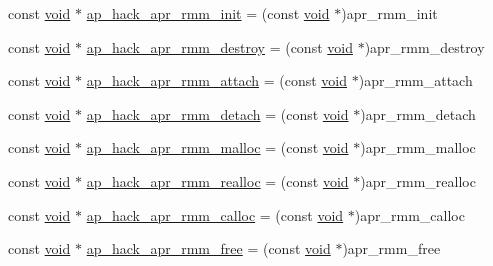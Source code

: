 \begin{DoxyCompactItemize}
\item 
const \hyperlink{group__MOD__ISAPI_gacd6cdbf73df3d9eed42fa493d9b621a6}{void} $\ast$ \hyperlink{srclib_2apr-util_2exports_8c_a153a0a8b4ae7204967c0879463a6faad}{ap\+\_\+hack\+\_\+apr\+\_\+rmm\+\_\+init} = (const \hyperlink{group__MOD__ISAPI_gacd6cdbf73df3d9eed42fa493d9b621a6}{void} $\ast$)apr\+\_\+rmm\+\_\+init
\item 
const \hyperlink{group__MOD__ISAPI_gacd6cdbf73df3d9eed42fa493d9b621a6}{void} $\ast$ \hyperlink{srclib_2apr-util_2exports_8c_afeb1fba037be4eebc182af074b1b9b7e}{ap\+\_\+hack\+\_\+apr\+\_\+rmm\+\_\+destroy} = (const \hyperlink{group__MOD__ISAPI_gacd6cdbf73df3d9eed42fa493d9b621a6}{void} $\ast$)apr\+\_\+rmm\+\_\+destroy
\item 
const \hyperlink{group__MOD__ISAPI_gacd6cdbf73df3d9eed42fa493d9b621a6}{void} $\ast$ \hyperlink{srclib_2apr-util_2exports_8c_ac1a375679c4604651ffde61dc78cc558}{ap\+\_\+hack\+\_\+apr\+\_\+rmm\+\_\+attach} = (const \hyperlink{group__MOD__ISAPI_gacd6cdbf73df3d9eed42fa493d9b621a6}{void} $\ast$)apr\+\_\+rmm\+\_\+attach
\item 
const \hyperlink{group__MOD__ISAPI_gacd6cdbf73df3d9eed42fa493d9b621a6}{void} $\ast$ \hyperlink{srclib_2apr-util_2exports_8c_a33efb78a2429238c441bad806232dec9}{ap\+\_\+hack\+\_\+apr\+\_\+rmm\+\_\+detach} = (const \hyperlink{group__MOD__ISAPI_gacd6cdbf73df3d9eed42fa493d9b621a6}{void} $\ast$)apr\+\_\+rmm\+\_\+detach
\item 
const \hyperlink{group__MOD__ISAPI_gacd6cdbf73df3d9eed42fa493d9b621a6}{void} $\ast$ \hyperlink{srclib_2apr-util_2exports_8c_a6991acc4c8dc510003b225185f33865d}{ap\+\_\+hack\+\_\+apr\+\_\+rmm\+\_\+malloc} = (const \hyperlink{group__MOD__ISAPI_gacd6cdbf73df3d9eed42fa493d9b621a6}{void} $\ast$)apr\+\_\+rmm\+\_\+malloc
\item 
const \hyperlink{group__MOD__ISAPI_gacd6cdbf73df3d9eed42fa493d9b621a6}{void} $\ast$ \hyperlink{srclib_2apr-util_2exports_8c_a67b990e5c0b6b00bdb4c71ecaf63dfc7}{ap\+\_\+hack\+\_\+apr\+\_\+rmm\+\_\+realloc} = (const \hyperlink{group__MOD__ISAPI_gacd6cdbf73df3d9eed42fa493d9b621a6}{void} $\ast$)apr\+\_\+rmm\+\_\+realloc
\item 
const \hyperlink{group__MOD__ISAPI_gacd6cdbf73df3d9eed42fa493d9b621a6}{void} $\ast$ \hyperlink{srclib_2apr-util_2exports_8c_ab2623cc2823e9d48561b792dfcb4b163}{ap\+\_\+hack\+\_\+apr\+\_\+rmm\+\_\+calloc} = (const \hyperlink{group__MOD__ISAPI_gacd6cdbf73df3d9eed42fa493d9b621a6}{void} $\ast$)apr\+\_\+rmm\+\_\+calloc
\item 
const \hyperlink{group__MOD__ISAPI_gacd6cdbf73df3d9eed42fa493d9b621a6}{void} $\ast$ \hyperlink{srclib_2apr-util_2exports_8c_a5da3c8e99034335347bad1911e2ed9b9}{ap\+\_\+hack\+\_\+apr\+\_\+rmm\+\_\+free} = (const \hyperlink{group__MOD__ISAPI_gacd6cdbf73df3d9eed42fa493d9b621a6}{void} $\ast$)apr\+\_\+rmm\+\_\+free

\end{DoxyCompactItemize}

